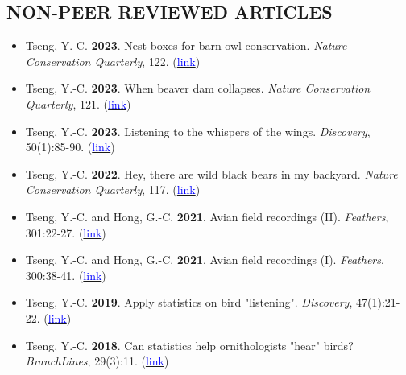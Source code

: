 \documentclass[11pt,letterpaper,sans]{moderncv}        %
\begin{document}
\subsection{NON-PEER REVIEWED ARTICLES}
\begin{itemize}

\item{Tseng, Y.-C. \textbf{2023}. Nest boxes for barn owl conservation. \textit{Nature Conservation Quarterly}}, 122. (\href{}{\textcolor{blue}{link}})
\vspace{3pt}

\item{Tseng, Y.-C. \textbf{2023}. When beaver dam collapses. \textit{Nature Conservation Quarterly}}, 121. (\href{https://www.tesri.gov.tw/Uploads/userfile/A15_1/2022-03-31_1337084121.pdf#page=41}{\textcolor{blue}{link}})
\vspace{3pt}

\item{Tseng, Y.-C. \textbf{2023}. Listening to the whispers of the wings. \textit{Discovery}}, 50(1):85-90. (\href{https://drive.google.com/file/d/1dJVMvOMULfuDzc_YATCUpOdxOxK6YwaX/view?usp=share_link}{\textcolor{blue}{link}})
\vspace{3pt}


\item{Tseng, Y.-C. \textbf{2022}. Hey, there are wild black bears in my backyard. \textit{Nature Conservation Quarterly}}, 117. (\href{https://www.tesri.gov.tw/Uploads/userfile/A15_1/2022-03-31_1337084121.pdf#page=41}{\textcolor{blue}{link}})
\vspace{3pt}

\item{Tseng, Y.-C. and Hong, G.-C. \textbf{2021}. Avian field recordings (II). \textit{Feathers}}, 301:22-27. (\href{https://www.bird.org.tw/feather}{\textcolor{blue}{link}})
\vspace{3pt}

\item{Tseng, Y.-C. and Hong, G.-C. \textbf{2021}. Avian field recordings (I). \textit{Feathers}}, 300:38-41. (\href{https://www.bird.org.tw/feather}{\textcolor{blue}{link}})
\vspace{3pt}

\item{Tseng, Y.-C. \textbf{2019}. Apply statistics on bird "listening". \textit{Discovery}}, 47(1):21-22. (\href{https://drive.google.com/open?id=1lZC8H246lFH-XCGI6vtBjXMIq1YqukUG}{\textcolor{blue}{link}})
\vspace{3pt}

\item{Tseng, Y.-C. \textbf{2018}. Can statistics help ornithologists "hear" birds? \textit{BranchLines}}, 29(3):11. (\href{https://forestry.ubc.ca/files/2019/04/bl-29.3.pdf#page=11}{\textcolor{blue}{link}}) 
\vspace{3pt}

\end{itemize}
\end{document}
